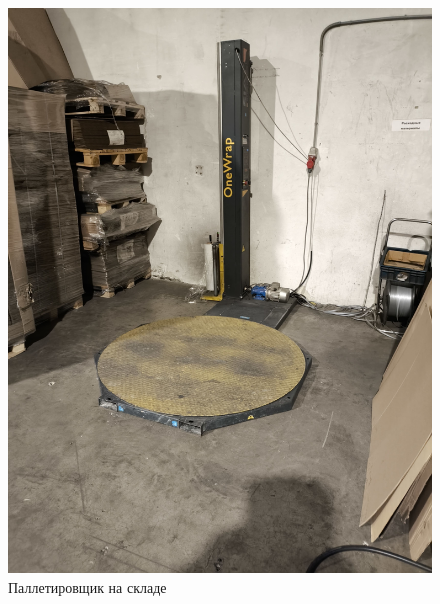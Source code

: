\begin{figure}
\begin{center}
 \includegraphics[height=0.7\textheight, keepaspectratio]{Pics/Х упаковка на складе.jpg }
\end{center}
 \caption{Паллетировщик на складе}
 \label{pic:Х упаковка на складе}
\end{figure}


